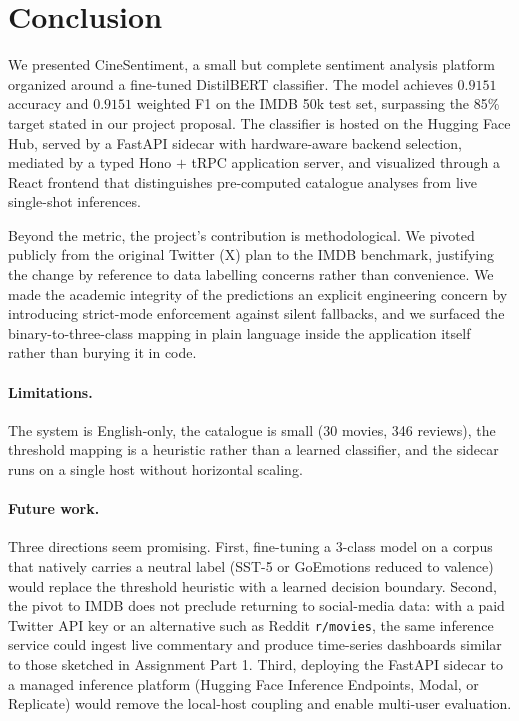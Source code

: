 \documentclass[11pt, a4paper]{article}
\begin{document}
\section{Conclusion}\label{sec:conclusion}

We presented CineSentiment, a small but complete sentiment analysis platform organized around a fine-tuned DistilBERT classifier. The model achieves $0.9151$ accuracy and $0.9151$ weighted F1 on the IMDB 50k test set, surpassing the 85\% target stated in our project proposal. The classifier is hosted on the Hugging Face Hub, served by a FastAPI sidecar with hardware-aware backend selection, mediated by a typed Hono $+$ tRPC application server, and visualized through a React frontend that distinguishes pre-computed catalogue analyses from live single-shot inferences.

Beyond the metric, the project's contribution is methodological. We pivoted publicly from the original Twitter (X) plan to the IMDB benchmark, justifying the change by reference to data labelling concerns rather than convenience. We made the academic integrity of the predictions an explicit engineering concern by introducing strict-mode enforcement against silent fallbacks, and we surfaced the binary-to-three-class mapping in plain language inside the application itself rather than burying it in code.

\paragraph{Limitations.}
The system is English-only, the catalogue is small (30 movies, 346 reviews), the threshold mapping is a heuristic rather than a learned classifier, and the sidecar runs on a single host without horizontal scaling.

\paragraph{Future work.}
Three directions seem promising. First, fine-tuning a 3-class model on a corpus that natively carries a neutral label (SST-5 or GoEmotions reduced to valence) would replace the threshold heuristic with a learned decision boundary. Second, the pivot to IMDB does not preclude returning to social-media data: with a paid Twitter API key or an alternative such as Reddit \texttt{r/movies}, the same inference service could ingest live commentary and produce time-series dashboards similar to those sketched in Assignment Part 1. Third, deploying the FastAPI sidecar to a managed inference platform (Hugging Face Inference Endpoints, Modal, or Replicate) would remove the local-host coupling and enable multi-user evaluation.



\end{document}
